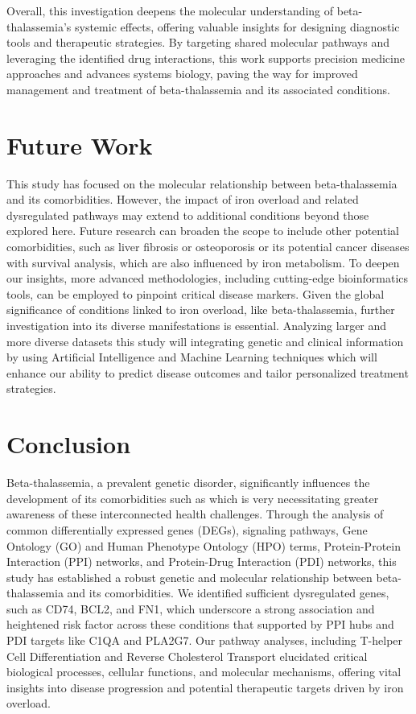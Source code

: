 Overall, this investigation deepens the molecular understanding of beta-thalassemia’s systemic effects, offering valuable insights for designing diagnostic tools and therapeutic strategies. By targeting shared molecular pathways and leveraging the identified drug interactions, this work supports precision medicine approaches and advances systems biology, paving the way for improved management and treatment of beta-thalassemia and its associated conditions.

\section{Future Work}
This study has focused on the molecular relationship between beta-thalassemia and its comorbidities. However, the impact of iron overload and related dysregulated pathways may extend to additional conditions beyond those explored here. Future research can broaden the scope to include other potential comorbidities, such as liver fibrosis or osteoporosis or its potential cancer diseases with survival analysis, which are also influenced by iron metabolism. To deepen our insights, more advanced methodologies, including cutting-edge bioinformatics tools, can be employed to pinpoint critical disease markers. Given the global significance of conditions linked to iron overload, like beta-thalassemia, further investigation into its diverse manifestations is essential. Analyzing larger and more diverse datasets this study will integrating genetic and clinical information by using Artificial Intelligence and Machine Learning techniques which will enhance our ability to predict disease outcomes and tailor personalized treatment strategies.

\section{Conclusion}

Beta-thalassemia, a prevalent genetic disorder, significantly influences the development of its comorbidities such as which is very necessitating greater awareness of these interconnected health challenges. Through the analysis of common differentially expressed genes (DEGs), signaling pathways, Gene Ontology (GO) and Human Phenotype Ontology (HPO) terms, Protein-Protein Interaction (PPI) networks, and Protein-Drug Interaction (PDI) networks, this study has established a robust genetic and molecular relationship between beta-thalassemia and its comorbidities. We identified sufficient dysregulated genes, such as CD74, BCL2, and FN1, which underscore a strong association and heightened risk factor across these conditions that supported by PPI hubs and PDI targets like C1QA and PLA2G7. Our pathway analyses, including T-helper Cell Differentiation and Reverse Cholesterol Transport elucidated critical biological processes, cellular functions, and molecular mechanisms, offering vital insights into disease progression and potential therapeutic targets driven by iron overload.\\


